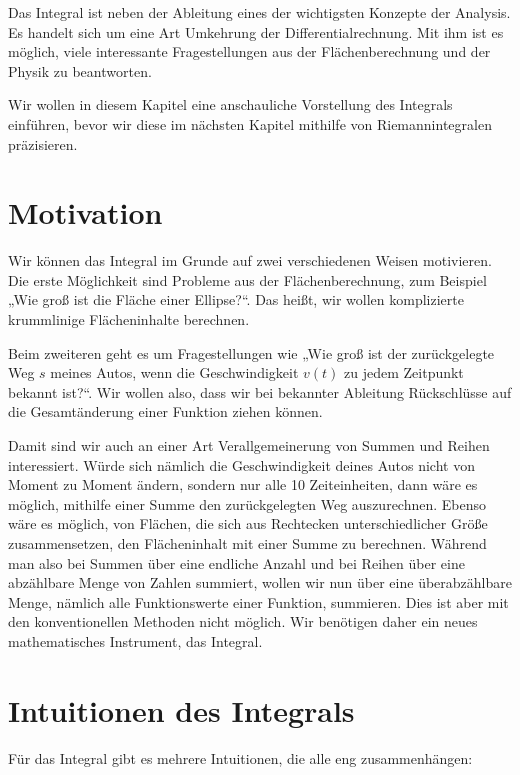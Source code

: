 \documentclass[fontsize=9pt,
               parskip=half-,
               DIV=14,
               listof=chapterentry,
               tocflat]{scrbook}
\begin{document}
Das Integral ist neben der Ableitung eines der wichtigsten Konzepte der Analysis. Es handelt sich um eine Art Umkehrung der Differentialrechnung. Mit ihm ist es möglich, viele interessante Fragestellungen aus der Flächenberechnung und der Physik zu beantworten.

Wir wollen in diesem Kapitel eine anschauliche Vorstellung des Integrals einführen, bevor wir diese im nächsten Kapitel mithilfe von Riemannintegralen präzisieren.

\section{Motivation}

Wir können das Integral im Grunde auf zwei verschiedenen Weisen motivieren. Die erste Möglichkeit sind Probleme aus der Flächenberechnung, zum Beispiel „Wie groß ist die Fläche einer Ellipse?“. Das heißt, wir wollen komplizierte krummlinige Flächeninhalte berechnen.

Beim zweiteren geht es um Fragestellungen wie „Wie groß ist der zurückgelegte Weg $s$ meines Autos, wenn die Geschwindigkeit $v(t)$ zu jedem Zeitpunkt bekannt ist?“. Wir wollen also, dass wir bei bekannter Ableitung Rückschlüsse auf die Gesamtänderung einer Funktion ziehen können.

Damit sind wir auch an einer Art Verallgemeinerung von Summen und Reihen interessiert. Würde sich nämlich die Geschwindigkeit deines Autos nicht von Moment zu Moment ändern, sondern nur alle 10 Zeiteinheiten, dann wäre es möglich, mithilfe einer Summe den zurückgelegten Weg auszurechnen. Ebenso wäre es möglich, von Flächen, die sich aus Rechtecken unterschiedlicher Größe zusammensetzen, den Flächeninhalt mit einer Summe zu berechnen. Während man also bei Summen über eine endliche Anzahl und bei Reihen über eine abzählbare Menge von Zahlen summiert, wollen wir nun über eine überabzählbare Menge, nämlich alle Funktionswerte einer Funktion, summieren. Dies ist aber mit den konventionellen Methoden nicht möglich. Wir benötigen daher ein neues mathematisches Instrument, das Integral.

\section{Intuitionen des Integrals}

Für das Integral gibt es mehrere Intuitionen, die alle eng zusammenhängen:
\end{document}
